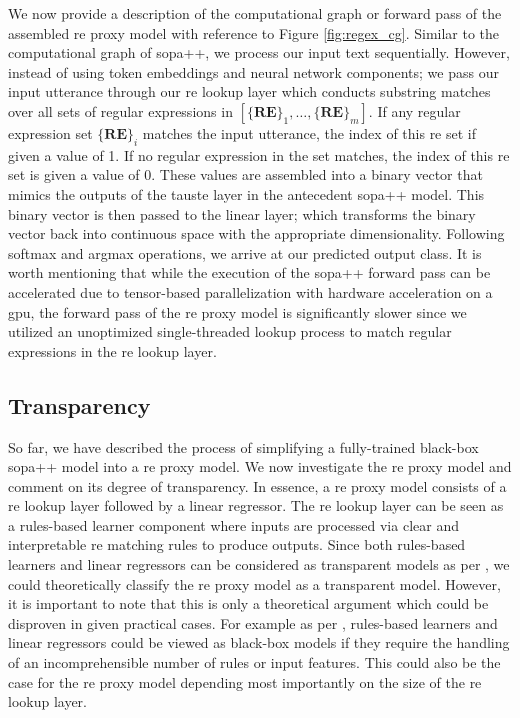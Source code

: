\label{section:re_cg}

We now provide a description of the computational graph or forward pass of the
assembled \ac{re} proxy model with reference to Figure \ref{fig:regex_cg}. Similar to
the computational graph of \ac{sopa}++, we process our input text sequentially.
However, instead of using token embeddings and neural network components; we
pass our input utterance through our \ac{re} lookup layer which conducts substring
matches over all sets of regular expressions in $[\{\textbf{RE}\}_1, \ldots,
\{\textbf{RE}\}_m]$. If any regular expression set $\{\textbf{RE}\}_i$ matches
the input utterance, the index of this \ac{re} set if given a value of 1. If no
regular expression in the set matches, the index of this \ac{re} set is given a value
of 0. These values are assembled into a binary vector that mimics the outputs of
the \ac{tauste} layer in the antecedent \ac{sopa}++ model. This binary vector is then
passed to the linear layer; which transforms the binary vector back
into continuous space with the appropriate dimensionality. Following softmax and
argmax operations, we arrive at our predicted output class. It is worth
mentioning that while the execution of the \ac{sopa}++ forward pass can be
accelerated due to tensor-based parallelization with hardware acceleration on a
\ac{gpu}, the forward pass of the \ac{re} proxy model is
significantly slower since we utilized an unoptimized single-threaded lookup
process to match regular expressions in the \ac{re} lookup layer.

\subsection{Transparency}

\label{section:re_transparency}

So far, we have described the process of simplifying a fully-trained black-box
\ac{sopa}++ model into a \ac{re} proxy model. We now investigate the \ac{re} proxy model and
comment on its degree of transparency. In essence, a \ac{re} proxy model consists of
a \ac{re} lookup layer followed by a linear regressor. The \ac{re} lookup layer can be
seen as a rules-based learner component where inputs are processed via clear and
interpretable \ac{re} matching rules to produce outputs. Since both rules-based
learners and linear regressors can be considered as transparent models as per
\citet[Page 7, Section 3]{arrieta2020explainable}, we could theoretically
classify the \ac{re} proxy model as a transparent model. However, it is important to
note that this is only a theoretical argument which could be disproven in given
practical cases. For example as per \citet[Page 9, Table
2]{arrieta2020explainable}, rules-based learners and linear regressors could be
viewed as black-box models if they require the handling of an incomprehensible
number of rules or input features. This could also be the case for the \ac{re} proxy
model depending most importantly on the size of the \ac{re} lookup layer.

